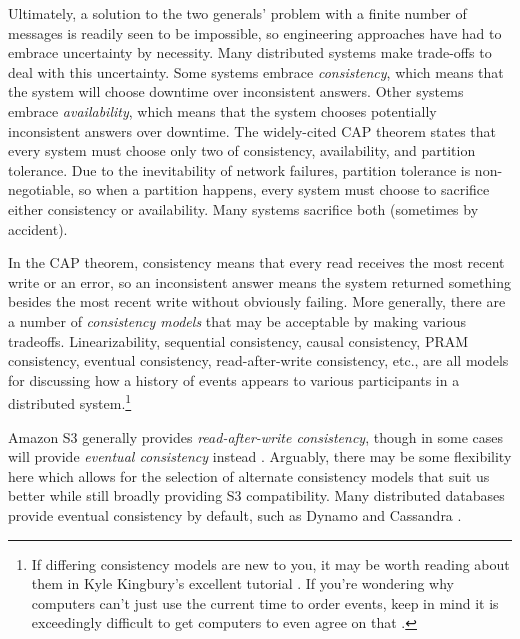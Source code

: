 \documentclass[11pt,fleqn,openany]{book}
\begin{document}
Ultimately, a solution to the two generals' problem with a finite number of
messages is readily seen to be impossible, so engineering approaches have had
to embrace uncertainty by necessity. Many distributed systems make trade-offs to
deal with this uncertainty. Some systems embrace {\em consistency}, which means
that the system will choose downtime over inconsistent answers. Other
systems embrace {\em availability}, which means that the system chooses
potentially inconsistent answers over downtime. The widely-cited CAP
theorem \cite{cap1, cap2} states that every system must choose only two of
consistency, availability, and partition tolerance.
Due to the inevitability of network
failures, partition tolerance is non-negotiable, so when a partition happens,
every system must choose to sacrifice either consistency or availability. Many
systems sacrifice both (sometimes by accident).

In the CAP theorem, consistency means that every read receives the most recent
write or an error, so an inconsistent answer means the system returned something
besides the most recent write without obviously failing. More generally, there
are a number of {\em consistency models} that may be acceptable by making
various tradeoffs. Linearizability, sequential consistency, causal consistency,
PRAM consistency, eventual consistency, read-after-write consistency, etc., are
all models for discussing how a history of events appears to various
participants in a distributed system.\footnote{If differing consistency models
are new to you, it may be worth reading about them in Kyle Kingbury's excellent
tutorial \cite{aphyr-consistency}. If you're wondering why computers can't just
use the current time to order events, keep in mind it is exceedingly difficult
to get computers to even agree on that \cite{no-now}.}

Amazon S3 generally provides {\em read-after-write consistency}, though in some
cases will provide {\em eventual consistency} instead \cite{s3-consistency}.
Arguably, there may be some flexibility here which allows for the selection
of alternate consistency models that suit us better while still broadly
providing S3 compatibility.
Many distributed databases provide eventual consistency by
default, such as Dynamo \cite{dynamo} and Cassandra \cite{cassandra}.
\end{document}
